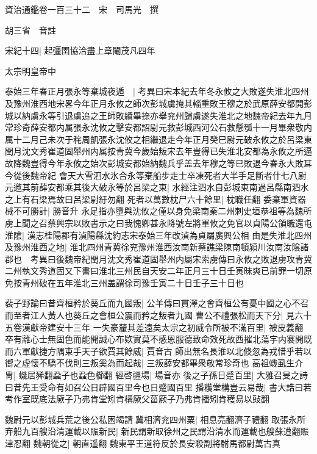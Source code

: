 資治通鑑卷一百三十二　宋　司馬光　撰

胡三省　音註

宋紀十四|{
	起彊圉協洽盡上章閹茂凡四年}


太宗明皇帝中

泰始三年春正月張永等棄城夜遁　|{
	考異曰宋本紀去年冬永攸之大敗遂失淮北四州及豫州淮西地宋畧今年正月永攸之師次彭城虜掩其輜重敗王穆之於武原薛安都開彭城以納虜永等引退虜追之王師敗績畢捺亦舉兖州歸虜遂失淮北之地魏帝紀去年九月常珍奇薛安都内属張永沈攸之擊安都詔尉元救彭城西河公石救懸瓠十一月畢衆敬内属十二月己未次于秺周凱張永沈攸之相繼退走今年正月癸巳尉元破永攸之於呂梁東閏月沈文秀崔道固舉州内属按青冀今歲始叛宋去年豈得已失淮北安都為永攸之所逼故降魏豈得今年永攸之始次彭城安都始納魏兵乎盖去年穆之等已敗退今春永大敗耳今從後魏帝紀}
會天大雪泗水氷合永等棄船步走士卒凍死者大半手足斷者什七八尉元邀其前薛安都乘其後大破永等於呂梁之東|{
	水經注泗水自彭城東南過呂縣南泗水之上有石梁焉故曰呂梁尉紆勿翻}
死者以萬數枕尸六十餘里|{
	枕職任翻}
委棄軍資器械不可勝計|{
	勝音升}
永足指亦墮與沈攸之僅以身免梁南秦二州刺史垣恭祖等為魏所虜上聞之召蔡興宗以敗書示之曰我愧卿甚永降號左將軍攸之免官以貞陽公領職還屯淮隂|{
	漢志桂陽郡有湞陽縣沈約志宋泰始三年改湞為貞屬廣興公相}
由是失淮北四州及豫州淮西之地|{
	淮北四州青冀徐兖豫州淮西汝南新蔡譙梁陳南頓潁川汝南汝隂諸郡也　考異曰後魏帝紀閏月沈文秀崔道固舉州内屬宋索虜傳曰永攸之敗退虜攻青冀二州執文秀道固又下書曰淮北三州民自天安二年正月三十日壬寅昧爽已前罪一切原免按青州破在五年淮北三州盖謂徐司豫壬寅二十日壬子三十日也}


裴子野論曰昔齊桓矜於葵丘而九國叛|{
	公羊傳曰貫澤之會齊桓公有憂中國之心不召而至者江人黃人也葵丘之會桓公震而矜之叛者九國}
曹公不禮張松而天下分|{
	見六十五卷漢獻帝建安十三年}
一失豪釐其差遠矣太宗之初威令所被不滿百里|{
	被皮義翻}
卒有離心士無固色而能開誠心布欵實莫不感恩服德致命效死故西摧北蕩宇内褰開既而六軍獻捷方隅束手天子欲賈其餘威|{
	賈音古}
師出無名長淮以北倏忽為戎惜乎若以嚮之虛懷不驕不伐則三叛奚為而起哉|{
	三叛薛安都畢衆敬常珍奇也}
高祖蟣虱生介冑|{
	蟣居豨翻蝨子也蝨色櫛翻}
經啓疆場|{
	場音亦}
後之子孫日蹙百里|{
	大雅召旻之詩曰昔先王受命有如召公日辟國百里今也日蹙國百里}
播穫堂構豈云易哉|{
	書大誥曰若考作室既底法厥子乃弗肯堂矧肯構厥父菑厥子乃弗肯播矧肯穫易以䜴翻}


魏尉元以彭城兵荒之後公私困竭請冀相濟兖四州粟|{
	相息亮翻濟子禮翻}
取張永所弃船九百艘沿清運載以賑新民|{
	新民謂新取徐州之民謂沿清水而運載也艘蘇遭翻賑津忍翻}
魏朝從之|{
	朝直遥翻}
魏東平王道符反於長安殺副將駙馬都尉萬古真

